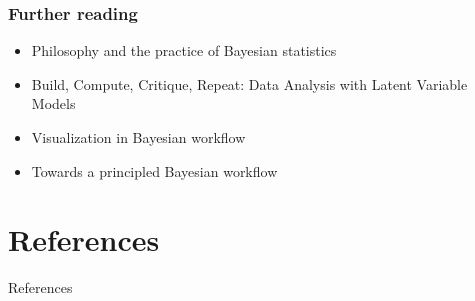 \documentclass[xcolor=table]{beamer}
\begin{document}
\begin{frame}
  \frametitle{Further reading}

  \begin{itemize}
    \item Philosophy and the practice of Bayesian statistics \cite{Gelman:2013b}
    \item Build, Compute, Critique, Repeat: Data Analysis with Latent Variable Models \cite{Blei:2014}
    \item Visualization in Bayesian workflow \cite{Gabry:2017}
    \item Towards a principled Bayesian workflow \cite{Betancourt:2018}
  \end{itemize}

\end{frame}


\section{References}
\begin{frame}[allowframebreaks]{References}
\scriptsize
% 
%

  
\end{frame}
\end{document}
